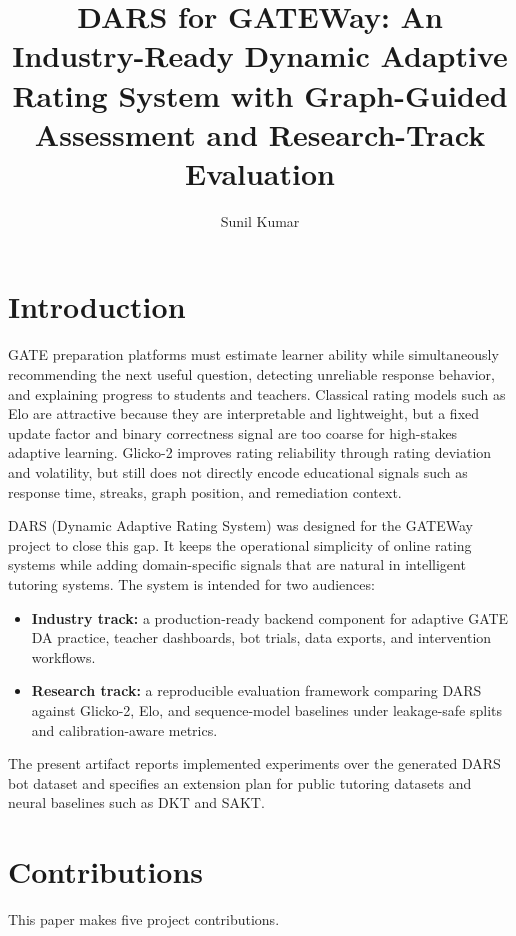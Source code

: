 \documentclass[sigconf,nonacm]{acmart}
\title[DARS for GATEWay]{DARS for GATEWay: An Industry-Ready Dynamic Adaptive Rating System with Graph-Guided Assessment and Research-Track Evaluation}
\author{Sunil Kumar}
\affiliation{%
  \institution{B.Tech Project: GATEWay Adaptive Preparation Platform}
  \city{India}
  \country{India}
}
\begin{document}
\maketitle

\section{Introduction}
GATE preparation platforms must estimate learner ability while simultaneously recommending the next useful question, detecting unreliable response behavior, and explaining progress to students and teachers. Classical rating models such as Elo are attractive because they are interpretable and lightweight, but a fixed update factor and binary correctness signal are too coarse for high-stakes adaptive learning. Glicko-2 improves rating reliability through rating deviation and volatility, but still does not directly encode educational signals such as response time, streaks, graph position, and remediation context.

DARS (Dynamic Adaptive Rating System) was designed for the GATEWay project to close this gap. It keeps the operational simplicity of online rating systems while adding domain-specific signals that are natural in intelligent tutoring systems. The system is intended for two audiences:

\begin{itemize}[leftmargin=*]
  \item \textbf{Industry track:} a production-ready backend component for adaptive GATE DA practice, teacher dashboards, bot trials, data exports, and intervention workflows.
  \item \textbf{Research track:} a reproducible evaluation framework comparing DARS against Glicko-2, Elo, and sequence-model baselines under leakage-safe splits and calibration-aware metrics.
\end{itemize}

The present artifact reports implemented experiments over the generated DARS bot dataset and specifies an extension plan for public tutoring datasets and neural baselines such as DKT and SAKT.

\section{Contributions}
This paper makes five project contributions.
\end{document}
